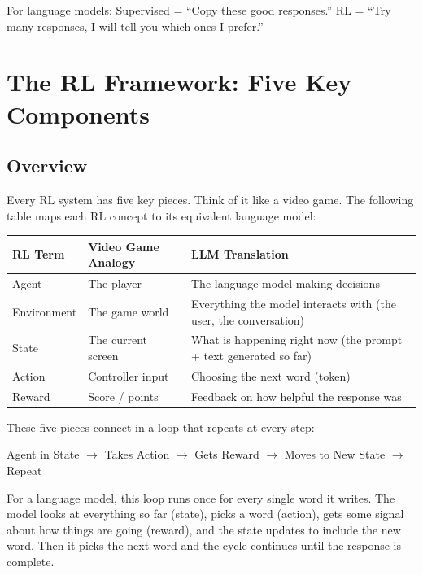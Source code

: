 \begin{chapterenv}
\begin{infobox}
For language models: Supervised = ``Copy these good responses.'' RL = ``Try many responses, I will tell you which ones I prefer.''
\end{infobox}

\section{The RL Framework: Five Key Components}

\subsection{Overview}

Every RL system has five key pieces. Think of it like a video game. The following table maps each RL concept to its equivalent language model:

\begin{center}
\begin{tabular}{p{}p{}p{}}
\toprule
\textbf{RL Term} & \textbf{Video Game Analogy} & \textbf{LLM Translation} \\
\midrule
Agent & The player & The language model making decisions \\
Environment & The game world & Everything the model interacts with (the user, the conversation) \\
State & The current screen & What is happening right now (the prompt + text generated so far) \\
Action & Controller input & Choosing the next word (token) \\
Reward & Score / points & Feedback on how helpful the response was \\
\bottomrule
\end{tabular}
\end{center}

These five pieces connect in a loop that repeats at every step:

\begin{center}
Agent in State $\rightarrow$ Takes Action $\rightarrow$ Gets Reward $\rightarrow$ Moves to New State $\rightarrow$ Repeat
\end{center}

For a language model, this loop runs once for every single word it writes. The model looks at everything so far (state), picks a word (action), gets some signal about how things are going (reward), and the state updates to include the new word. Then it picks the next word and the cycle continues until the response is complete.


\end{chapterenv}
